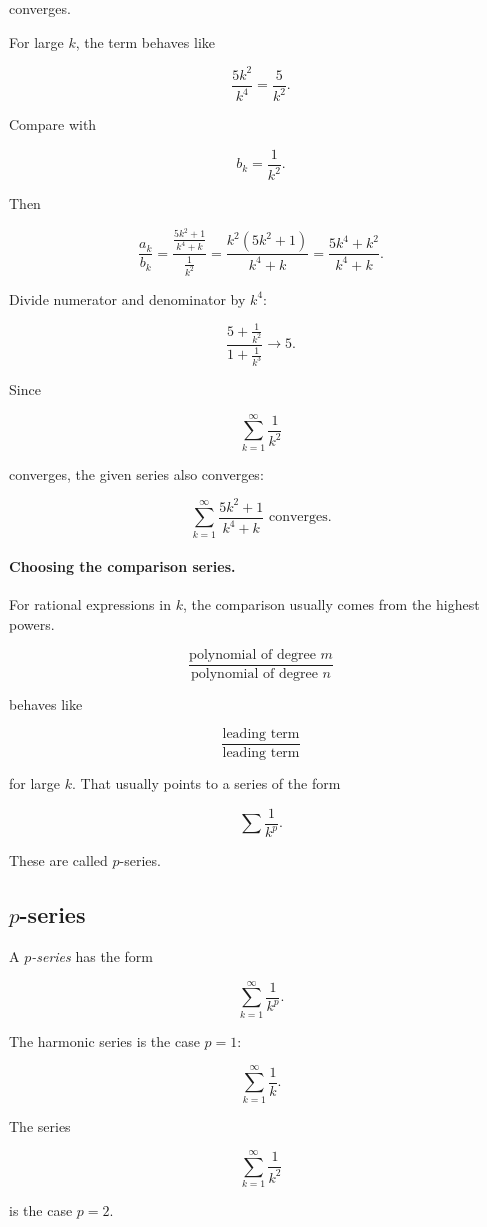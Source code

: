 converges.

For large \(k\), the term behaves like

\[
\frac{5k^2}{k^4}=\frac5{k^2}.
\]

Compare with

\[
b_k=\frac1{k^2}.
\]

Then

\[
\frac{a_k}{b_k}
=
\frac{\frac{5k^2+1}{k^4+k}}{\frac1{k^2}}
=
\frac{k^2(5k^2+1)}{k^4+k}
=
\frac{5k^4+k^2}{k^4+k}.
\]

Divide numerator and denominator by \(k^4\):

\[
\frac{5+\frac1{k^2}}{1+\frac1{k^3}}\to5.
\]

Since

\[
\sum_{k=1}^{\infty}\frac1{k^2}
\]

converges, the given series also converges:

\[
\boxed{
\sum_{k=1}^{\infty}\frac{5k^2+1}{k^4+k} \text{ converges.}
}
\]

\paragraph{Choosing the comparison series.}
For rational expressions in \(k\), the comparison usually comes from the highest powers.

\[
\frac{\text{polynomial of degree }m}{\text{polynomial of degree }n}
\]

behaves like

\[
\frac{\text{leading term}}{\text{leading term}}
\]

for large \(k\).  That usually points to a series of the form

\[
\sum \frac1{k^p}.
\]

These are called \(p\)-series.

\subsection{\(p\)-series}
\label{subsec:p-series}

A \emph{\(p\)-series} has the form

\[
\sum_{k=1}^{\infty}\frac1{k^p}.
\]

The harmonic series is the case \(p=1\):

\[
\sum_{k=1}^{\infty}\frac1k.
\]

The series

\[
\sum_{k=1}^{\infty}\frac1{k^2}
\]

is the case \(p=2\).

